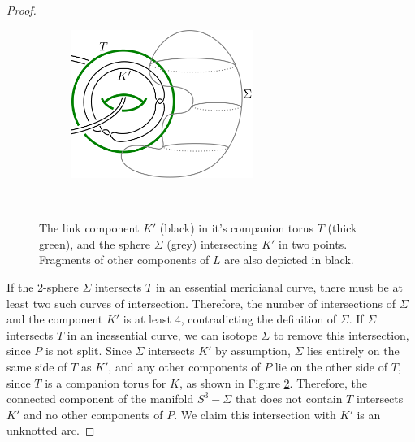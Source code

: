 \documentclass[12pt]{amsart}
\theoremstyle{definition}
\theoremstyle{remark}
\begin{document}
\begin{proof}
\begin{figure}[ht]
\centering
    \begin{subfigure}[b]{0.5\textwidth}
        \centering
        \includegraphics[height=1.9in]{lemmapic.png}
        \caption{}
        \label{fig_lemmapica}
    \end{subfigure}%
~~~~~
    \begin{subfigure}[b]{0.4\textwidth}
        \centering
        \caption{}
        \label{fig_lemmapicb}
    \end{subfigure}
\caption{The link component $K'$ (black) in it's companion torus $T$ (thick green), and the sphere $\Sigma$ (grey) intersecting $K'$ in two points. Fragments of other components of $L$ are also depicted in black. }
\label{fig_lemmapic}

\end{figure}

If the 2-sphere $\Sigma$ intersects $T$ in an essential meridianal curve, there must be at least two such curves of intersection. Therefore, the number of intersections of $\Sigma$ and the component $K'$ is at least 4, contradicting the definition of $\Sigma$. If $\Sigma$ intersects $T$ in an inessential curve, we can isotope $\Sigma$ to remove this intersection, since $P$ is not split.  Since $\Sigma$ intersects $K'$ by assumption, $\Sigma$ lies entirely on the same side of $T$ as $K'$, and any other components of $P$ lie on the other side of $T$, since $T$ is a companion torus for $K$, as shown in Figure \ref{fig_lemmapicb}.  Therefore, the connected component of the manifold $S^3 - \Sigma$ that does not contain $T$ intersects $K'$ and no other components of $P$.  We claim this intersection with $K'$ is an unknotted arc.




\end{proof}
\end{document}
